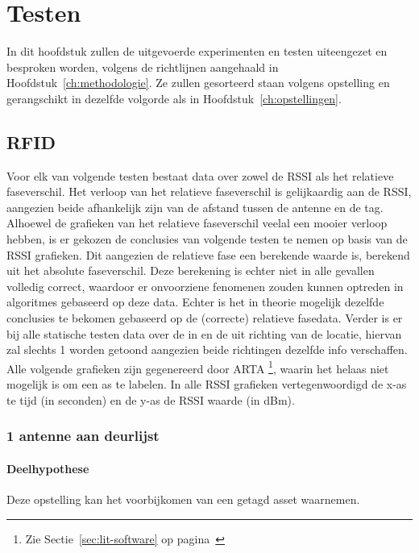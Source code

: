 
\chapter{Testen}
\label{ch:testen}

In dit hoofdstuk zullen de uitgevoerde experimenten en testen uiteengezet en besproken worden, volgens de richtlijnen aangehaald in Hoofdstuk~\ref{ch:methodologie}. Ze zullen gesorteerd staan volgens opstelling en gerangschikt in dezelfde volgorde als in Hoofdstuk~\ref{ch:opstellingen}.

\section{RFID}
Voor elk van volgende testen bestaat data over zowel de RSSI als het relatieve faseverschil. Het verloop van het relatieve faseverschil is gelijkaardig aan de RSSI, aangezien beide afhankelijk zijn van de afstand tussen de antenne en de tag. Alhoewel de grafieken van het relatieve faseverschil veelal een mooier verloop hebben, is er gekozen de conclusies van volgende testen te nemen op basis van de RSSI grafieken. Dit aangezien de relatieve fase een berekende waarde is, berekend uit het absolute faseverschil. Deze berekening is echter niet in alle gevallen volledig correct, waardoor er onvoorziene fenomenen zouden kunnen optreden in algoritmes gebaseerd op deze data. Echter is het in theorie mogelijk dezelfde conclusies te bekomen gebaseerd op de (correcte) relatieve fasedata.
Verder is er bij alle statische testen data over de in en de uit richting van de locatie, hiervan zal slechts 1 worden getoond aangezien beide richtingen dezelfde info verschaffen.
Alle volgende grafieken zijn gegenereerd door ARTA \footnote{Zie Sectie~\ref{sec:lit-software} op pagina~\pageref{sec:lit-software}}, waarin het helaas niet mogelijk is om een as te labelen. In alle RSSI grafieken vertegenwoordigd de x-as te tijd (in seconden) en de y-as de RSSI waarde (in dBm).

\subsection{1 antenne aan deurlijst}
\label{sec:ond-rfid-1}
\subsubsection{Deelhypothese}
Deze opstelling kan het voorbijkomen van een getagd asset waarnemen.

